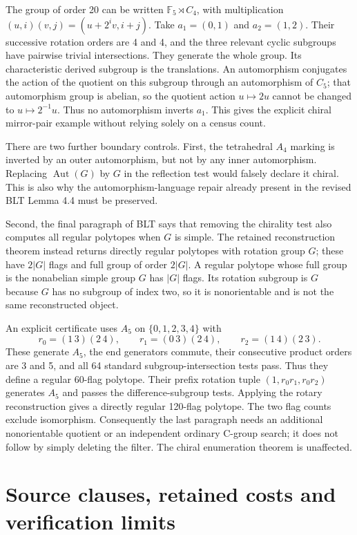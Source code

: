 \documentclass[11pt]{article}
\theoremstyle{remark}\newtheorem{remark}[theorem]{Remark}
\newcommand{\Aut}{\operatorname{Aut}}
\begin{document}
The group of order 20 can be written
$\mathbb F_5\rtimes C_4$, with multiplication
$(u,i)(v,j)=(u+2^iv,i+j)$.
Take $a_1=(0,1)$ and $a_2=(1,2)$. Their successive rotation orders are 4 and 4, and the three relevant cyclic subgroups have pairwise trivial intersections. They generate the whole group. Its characteristic derived subgroup is the translations. An automorphism conjugates the action of the quotient on this subgroup through an automorphism of $C_5$; that automorphism group is abelian, so the quotient action $u\mapsto2u$ cannot be changed to $u\mapsto2^{-1}u$. Thus no automorphism inverts $a_1$. This gives the explicit chiral mirror-pair example without relying solely on a census count.

There are two further boundary controls. First, the tetrahedral $A_4$ marking is inverted by an outer automorphism, but not by any inner automorphism. Replacing $\Aut(G)$ by $G$ in the reflection test would falsely declare it chiral. This is also why the automorphism-language repair already present in the revised BLT Lemma 4.4 must be preserved.

Second, the final paragraph of BLT says that removing the chirality test also computes all regular polytopes when $G$ is simple. The retained reconstruction theorem instead returns directly regular polytopes with rotation group $G$; these have $2|G|$ flags and full group of order $2|G|$. A regular polytope whose full group is the nonabelian simple group $G$ has $|G|$ flags. Its rotation subgroup is $G$ because $G$ has no subgroup of index two, so it is nonorientable and is not the same reconstructed object.

An explicit certificate uses $A_5$ on $\{0,1,2,3,4\}$ with
\[
r_0=(1\,3)(2\,4),\qquad
r_1=(0\,3)(2\,4),\qquad
r_2=(1\,4)(2\,3).
\tag{11}
\]
These generate $A_5$, the end generators commute, their consecutive product orders are 3 and 5, and all 64 standard subgroup-intersection tests pass. Thus they define a regular 60-flag polytope. Their prefix rotation tuple
$(1,r_0r_1,r_0r_2)$ generates $A_5$ and passes the difference-subgroup tests. Applying the rotary reconstruction gives a directly regular 120-flag polytope. The two flag counts exclude isomorphism. Consequently the last paragraph needs an additional nonorientable quotient or an independent ordinary C-group search; it does not follow by simply deleting the filter. The chiral enumeration theorem is unaffected.

\section{Source clauses, retained costs and verification limits}
\end{document}
